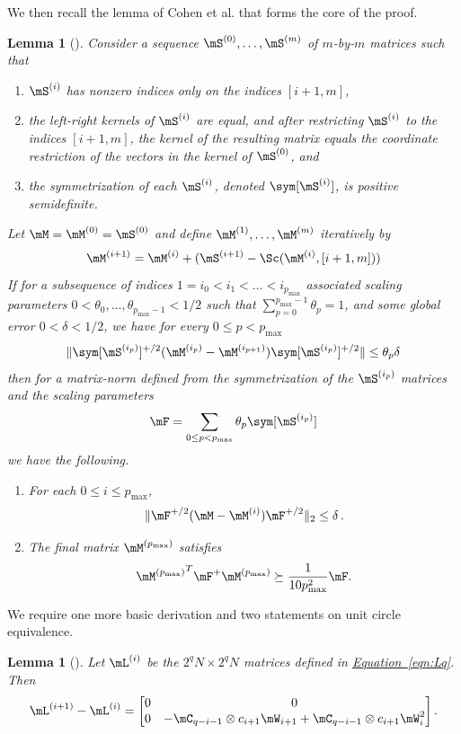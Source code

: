 \documentclass[11pt]{article}
\newcommand{\expeqref}[2]{\texorpdfstring{\hyperref[#2]{#1~\eqref{#2}}}{#1~\eqref{#2}}}
\newtheorem{lemma}[theorem]{Lemma}
\begin{document}
\noindent
We then recall the lemma of Cohen et al. \cite{CKKPPRS18} %
that forms the core of the 
proof. %
%
%
%
\begin{lemma}[{\cite[Lemma 2.3]{CKKPPRS18}}]  %
\label{app:sc}
  Consider a sequence
%
%
$\mS^{(0)},\ldots,\mS^{(m)}$
of $m$-by-$m$ matrices %
such that  %
%
%
%
\begin{enumerate}
    \item $\mS^{(i)}$ has nonzero indices only on the indices $[i+1,m]$,
    \item the left-right kernels of $\mS^{(i)}$ are equal, and after restricting $\mS^{(i)}$ to the indices $[i+1,m]$, the kernel of the resulting matrix equals the coordinate restriction of the vectors in the kernel of $\mS^{(0)}$, and  %
    \item the symmetrization of each $\mS^{(i)}$, denoted $\sym[\mS^{(i)}]$, is positive
%
semidefinite.  %
\end{enumerate}
Let $\mM=\mM^{(0)}=\mS^{(0)}$ and define $\mM^{(1)},\ldots, \mM^{(m)}$ iteratively by
$$\mM^{(i+1)} = \mM^{(i)} + (\mS^{(i+1)} - \Sc(\mM^{(i)},[i+1,m]))$$
If for a subsequence of indices $1 =i_0<i_1<\ldots<  i_{p_{\max}}$ associated scaling parameters $0< \theta_0,\ldots,\theta_{p_{\max}-1}<1/2$ such that $\sum_{p=0}^{p_{\max}-1}\theta_p=1$, and some global error $0< \delta <1/2$, we have for 
every $0\leq p < p_{\max}$ %
$$\|\sym[\mS^{(i_p)}]^{+/2}(\mM^{(i_p)}-\mM^{(i_{p+1})})\sym[\mS^{(i_p)}]^{+/2}\| \leq \theta_p\delta$$
then for a matrix-norm defined from the symmetrization of the $\mS^{(i_p)}$ matrices and the scaling parameters
$$\mF = \sum_{0\leq p<p_{\max}}\theta_p \sym[\mS^{(i_p)}]$$
we have the following.  %
\begin{enumerate}
    \item For each $0\leq i\leq p_{\max}$,
    $$\|\mF^{+/2}(\mM-\mM^{(i)})\mF^{+/2}\|_2 \leq \delta\,.$$
    \item The final matrix $\mM^{(p_{\max})}$ satisfies
    $${\mM^{(p_{\max})}}^T\mF^+\mM^{(p_{\max})}\succeq \frac{1}{10p^2_{\max}}\mF.$$
\end{enumerate}
\end{lemma}

We require one more basic derivation and two statements on unit circle equivalence.
%
\begin{lemma}[{\cite[Lemma D.2]{AhmadinejadKeMuPeSiVa19}}] %
\label{app:diff}
Let $\mL^{(i)}$ be the $2^qN\times 2^qN$ matrices defined in  \expeqref{Equation}{eqn:Lq}. Then
$$\mL^{(i+1)}-\mL^{(i)} = \begin{bmatrix} 0 & 0\\ 0 & -\mC_{q-i-1}\otimes c_{i+1}\mW_{i+1}+\mC_{q-i-1}\otimes c_{i+1}\mW_{i}^2\end{bmatrix}.$$
\end{lemma}
\end{document}
